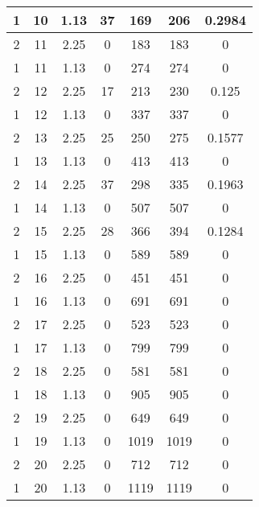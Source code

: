 \documentclass[letterpaper, 12pt]{article}
\begin{document}
\begin{longtable}{|c|c|c|c|c|c|c|}
\hline
1 & 10 & 1.13 & 37 & 169 & 206 & 0.2984 \\
\hline
2 & 11 & 2.25 & 0 & 183 & 183 & 0 \\
\hline
1 & 11 & 1.13 & 0 & 274 & 274 & 0 \\
\hline
2 & 12 & 2.25 & 17 & 213 & 230 & 0.125 \\
\hline
1 & 12 & 1.13 & 0 & 337 & 337 & 0 \\
\hline
2 & 13 & 2.25 & 25 & 250 & 275 & 0.1577 \\
\hline
1 & 13 & 1.13 & 0 & 413 & 413 & 0 \\
\hline
2 & 14 & 2.25 & 37 & 298 & 335 & 0.1963 \\
\hline
1 & 14 & 1.13 & 0 & 507 & 507 & 0 \\
\hline
2 & 15 & 2.25 & 28 & 366 & 394 & 0.1284 \\
\hline
1 & 15 & 1.13 & 0 & 589 & 589 & 0 \\
\hline
2 & 16 & 2.25 & 0 & 451 & 451 & 0 \\
\hline
1 & 16 & 1.13 & 0 & 691 & 691 & 0 \\
\hline
2 & 17 & 2.25 & 0 & 523 & 523 & 0 \\
\hline
1 & 17 & 1.13 & 0 & 799 & 799 & 0 \\
\hline
2 & 18 & 2.25 & 0 & 581 & 581 & 0 \\
\hline
1 & 18 & 1.13 & 0 & 905 & 905 & 0 \\
\hline
2 & 19 & 2.25 & 0 & 649 & 649 & 0 \\
\hline
1 & 19 & 1.13 & 0 & 1019 & 1019 & 0 \\
\hline
2 & 20 & 2.25 & 0 & 712 & 712 & 0 \\
\hline
1 & 20 & 1.13 & 0 & 1119 & 1119 & 0 \\
\hline
\end{longtable}
\end{document}
